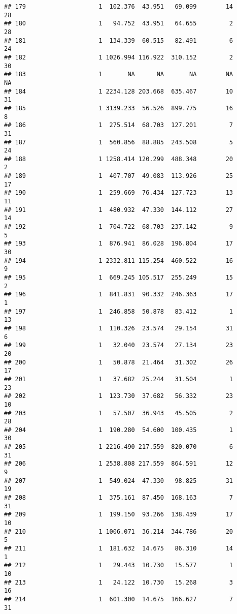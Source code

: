 \documentclass[
]{article}
\begin{document}
\begin{verbatim}
## 179                    1  102.376  43.951   69.099        14        28
## 180                    1   94.752  43.951   64.655         2        28
## 181                    1  134.339  60.515   82.491         6        24
## 182                    1 1026.994 116.922  310.152         2        30
## 183                    1       NA      NA       NA        NA        NA
## 184                    1 2234.128 203.668  635.467        10        31
## 185                    1 3139.233  56.526  899.775        16         8
## 186                    1  275.514  68.703  127.201         7        31
## 187                    1  560.856  88.885  243.508         5        24
## 188                    1 1258.414 120.299  488.348        20         2
## 189                    1  407.707  49.083  113.926        25        17
## 190                    1  259.669  76.434  127.723        13        11
## 191                    1  480.932  47.330  144.112        27        14
## 192                    1  704.722  68.703  237.142         9         5
## 193                    1  876.941  86.028  196.804        17        30
## 194                    1 2332.811 115.254  460.522        16         9
## 195                    1  669.245 105.517  255.249        15         2
## 196                    1  841.831  90.332  246.363        17         1
## 197                    1  246.858  50.878   83.412         1        13
## 198                    1  110.326  23.574   29.154        31         6
## 199                    1   32.040  23.574   27.134        23        20
## 200                    1   50.878  21.464   31.302        26        17
## 201                    1   37.682  25.244   31.504         1        23
## 202                    1  123.730  37.682   56.332        23        10
## 203                    1   57.507  36.943   45.505         2        28
## 204                    1  190.280  54.600  100.435         1        30
## 205                    1 2216.490 217.559  820.070         6        31
## 206                    1 2538.808 217.559  864.591        12         9
## 207                    1  549.024  47.330   98.825        31        19
## 208                    1  375.161  87.450  168.163         7        31
## 209                    1  199.150  93.266  138.439        17        10
## 210                    1 1006.071  36.214  344.786        20         5
## 211                    1  181.632  14.675   86.310        14         1
## 212                    1   29.443  10.730   15.577         1        10
## 213                    1   24.122  10.730   15.268         3        16
## 214                    1  601.300  14.675  166.627         7        31

\end{verbatim}
\end{document}
